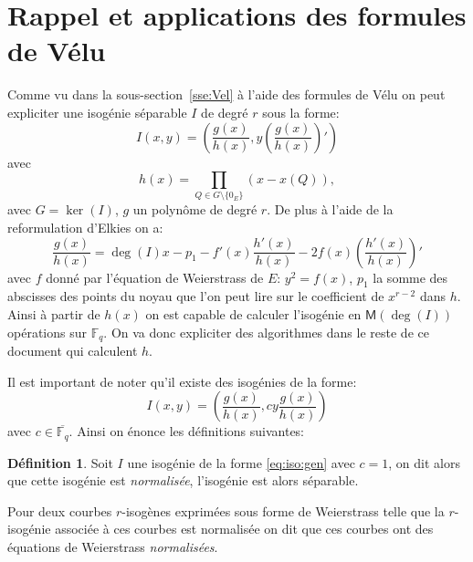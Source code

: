\documentclass[10pt,a4paper]{book}
\theoremstyle{plain}
\theoremstyle{definition}
\theoremstyle{definition}
\theoremstyle{definition}
\theoremstyle{definition}
\theoremstyle{definition}
\newtheorem{defi}[thm]{Définition}
\theoremstyle{remark}
\theoremstyle{remark}
\theoremstyle{definition}
\begin{document}
\section{Rappel et applications des formules de Vélu}
Comme vu dans la sous-section~\ref{sse:Vel} à l'aide des formules de Vélu on peut expliciter une isogénie séparable $I$ de degré $r$ sous la forme:
\begin{equation} 
I(x,y)=\left(\frac{g(x)}{h(x)},y\left( \frac{g(x)}{h(x)} \right)'\right)
\end{equation}
avec 
\begin{equation*}
h(x)=\prod_{Q \in G \setminus \{0_E\}}(x-x(Q)),
\end{equation*}
avec $G=\ker(I)$, $g$ un polynôme de degré $r$. De plus à l'aide de la reformulation d'Elkies on a:
\begin{equation}
\label{eq:vel:elk}
\frac{g(x)}{h(x)}= \deg(I) x -p_1 - f'(x) \frac{h'(x)}{h(x)} -2f(x)  \left(\frac{h'(x)}{h(x)}\right)'
\end{equation}
avec $f$ donné par l'équation de Weierstrass de $E$: $y^2=f(x)$, $p_1$ la somme des abscisses des points du noyau que l'on peut lire sur le coefficient de $x^{r-2}$ dans $h$. Ainsi à partir de $h(x)$ on est capable de calculer l'isogénie en $\mathsf{M}(\deg(I))$ opérations sur $\mathbb{F}_q$. On va donc expliciter des algorithmes dans le reste de ce document qui calculent $h$.


Il est important de noter qu'il existe des isogénies de la forme:
\begin{equation}
\label{eq:iso:gen}
I(x,y)=\left( \frac{g(x)}{h(x)},cy\frac{g(x)}{h(x)} \right)
\end{equation}
avec $c \in \overline{\mathbb{F}_q}$. Ainsi on énonce les définitions suivantes:


\begin{defi}
Soit $I$ une isogénie de la forme \eqref{eq:iso:gen} avec $c=1$, on dit alors 
que cette isogénie est \emph{normalisée}, l'isogénie est alors séparable. 

Pour deux courbes $r$-isogènes exprimées sous forme de Weierstrass telle que
la $r$-isogénie associée à ces courbes est normalisée on dit que ces 
courbes ont des équations de Weierstrass \emph{normalisées}. 
\end{defi}
\end{document}
